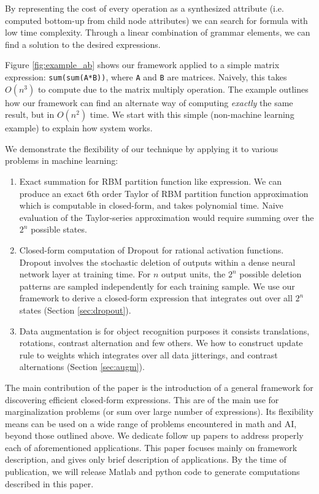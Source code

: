 \noindent
By representing the cost of every operation as a synthesized attribute
(i.e. computed bottom-up from child node attributes) we can search for
formula with low time complexity. Through a linear combination of
grammar elements, we can find a solution to the desired
expressions. 



Figure \ref{fig:example_ab} shows our framework applied to a simple matrix expression:
\texttt{sum(sum(A*B))}, where \texttt{A} and \texttt{B} are matrices. Naively, this takes $O(n^3)$ to compute due to
the matrix multiply operation. The example outlines how our framework
can find an alternate way of computing {\em exactly} the same result,
but in $O(n^2)$ time. We start with this simple (non-machine learning example) to
explain how system works.

We demonstrate the flexibility of our technique by applying it to 
various problems in machine learning: 
\begin{enumerate}
\vspace{-2mm}
\item Exact summation for RBM partition function like expression. We can produce an exact 6th order 
  Taylor of RBM partition function approximation which is
  computable in closed-form, and takes polynomial time.
  Naive evaluation of the Taylor-series
  approximation would require summing over the $2^n$ possible states.   
\item Closed-form computation of Dropout for rational activation functions. 
  Dropout \cite{hinton2012improving}
  involves the  stochastic deletion of outputs within a dense neural
  network layer at training time. For $n$ output units, the $2^n$
  possible deletion patterns are sampled independently for each
  training sample. We use our framework to derive a closed-form
  expression that integrates out over all $2^n$ states (Section \ref{sec:dropout}).
\item Data augmentation is for object recognition purposes it consists
  translations, rotations, contrast alternation and few others. 
  We how to construct update rule to weights which
  integrates over all data jitterings, and contrast alternations (Section \ref{sec:augm}).
\end{enumerate}
\vspace{-2mm}

The main contribution of the paper is the introduction of a general
framework for discovering efficient closed-form expressions. This are
of the main use for marginalization problems (or sum over large number of
expressions). Its
flexibility means can be used on a wide range of problems encountered
in math and AI, beyond those outlined above. We dedicate follow up 
papers to address properly each of aforementioned applications. This
paper focuses mainly on framework description, and gives only brief description
of applications. By the time of publication, we will release Matlab and python
code to generate computations described in this paper.

